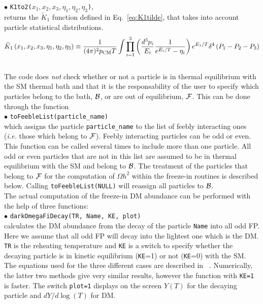 \documentclass[12pt,a4paper]{article}
\begin{document}
\noindent$ \bullet$ \verb|K1to2(|$x_1,x_2,x_3,\eta_1,\eta_2,\eta_3$\verb|)|,\\
 returns the $\tilde{K}_1$ function defined in Eq.~\eqref{eq:K1tilde}, that takes into account particle statistical distributions.  
 \begin{equation}\label{eq:K1tilde}
\tilde K_1 \left( x_1, x_2, x_3, \eta_1, \eta_2, \eta_3 \right)  \equiv
\frac{1}{(4\pi)^2 p_{\rm CM} T} \int \prod\limits_{i=1}^{3} \left( \frac{d^3 p_i}{E_i} \frac{1}{e^{E_i/T} - \eta_i} \right) e^{E_1/T} \delta^4 \left( P_1 - P_2 - P_3 \right) 
\end{equation}
\\
The code does \textit{not} check whether or not a particle is in thermal equilibrium with the SM thermal bath and that it is the responsability of the user to specify which particles belong to the bath, ${\cal B}$, or are out of equilibrium, ${\cal F}$. This can be done through the function\\
\noindent
$\bullet$ \verb|toFeebleList(particle_name)|\\
which assigns the particle \verb|particle_name| to the list of feebly interacting ones (\textit{i.e.} those which belong to ${\cal F}$). Feebly interacting particles can be odd or even.   
This function can be called several times to include more than one particle.  All  odd or even particles that are not in this list are assumed to be in thermal equilibrium with the SM and belong to ${\cal B}$. 
The treatment of the particles that belong to  ${\cal F}$ for the computation of $\Omega h^2$ within the freeze-in routines is described below. 
Calling \verb|toFeebleList(NULL)| will reassign all particles to ${\cal B}$.\\



The actual computation of the freeze-in DM abundance can be performed with the help of three functions:\\
\noindent
$\bullet$ \verb|darkOmegaFiDecay(TR, Name, KE, plot) | \\
calculates the  DM abundance from the  decay of the particle \verb|Name| into all odd FP. Here we assume that all odd FP will decay into the lightest one which is the DM. \verb|TR| is the  reheating temperature and \verb|KE| is a switch to specify whether the decaying particle is in kinetic equilibrium (\verb|KE|=1) or not (\verb|KE|=0) with the SM.
The equations used for the three different cases are described in ~\cite{Belanger:2018ccd}.
 Numerically, the latter two methods give very similar results, however the function with \verb|KE=1| is faster. The switch \verb|plot=1| displays on the screen  $Y(T)$ for the decaying particle and $dY/d\log(T)$ for DM.\\
\end{document}
